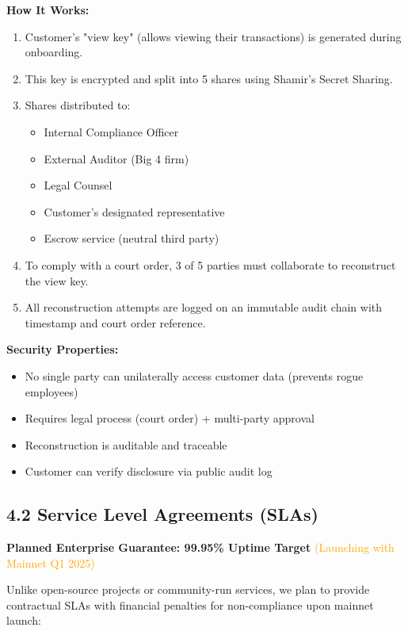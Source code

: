 \documentclass[11pt,a4paper]{article}
\begin{document}
\textbf{How It Works:}
\begin{enumerate}
    \item Customer's "view key" (allows viewing their transactions) is generated during onboarding.

    \item This key is encrypted and split into 5 shares using Shamir's Secret Sharing.

    \item Shares distributed to:
    \begin{itemize}
        \item Internal Compliance Officer
        \item External Auditor (Big 4 firm)
        \item Legal Counsel
        \item Customer's designated representative
        \item Escrow service (neutral third party)
    \end{itemize}

    \item To comply with a court order, 3 of 5 parties must collaborate to reconstruct the view key.

    \item All reconstruction attempts are logged on an immutable audit chain with timestamp and court order reference.
\end{enumerate}

\textbf{Security Properties:}
\begin{itemize}
    \item No single party can unilaterally access customer data (prevents rogue employees)
    \item Requires legal process (court order) + multi-party approval
    \item Reconstruction is auditable and traceable
    \item Customer can verify disclosure via public audit log
\end{itemize}

\subsection{4.2 Service Level Agreements (SLAs)}

\textbf{Planned Enterprise Guarantee: 99.95\% Uptime Target} \textcolor{orange}{(Launching with Mainnet Q1 2025)}

Unlike open-source projects or community-run services, we plan to provide contractual SLAs with financial penalties for non-compliance upon mainnet launch:
\end{document}
